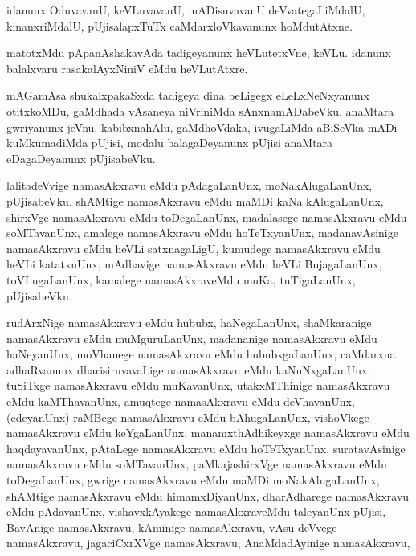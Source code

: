 \documentclass{article}
\begin{document}
\begin{mn}
idanunx  OduvavanU,  keVLuvavanU,  mADisuvavanU  deVvategaLiMdalU,  kinanxriMdalU,  pUjisalapxTuTx  
caMdarxloVkavanunx  hoMdutAtxne.
\end{mn}

\begin{mn}
matotxMdu  pApanAshakavAda  tadigeyanunx  heVLutetxVne,  keVLu.  idanunx  balalxvaru  rasakalAyxNiniV  eMdu  heVLutAtxre. 
\end{mn}

\begin{mn}
mAGamAsa  shukalxpakaSxda  tadigeya  dina  beLigegx  eLeLxNeNxyanunx  otitxkoMDu,  gaMdhada  vAsaneya  
niVriniMda  sAnxnamADabeVku.  anaMtara  gwriyanunx  jeVnu,  kabibxnahAlu,  gaMdhoVdaka,  ivugaLiMda  
aBiSeVka  mADi  kuMkumadiMda  pUjisi,  modalu  balagaDeyanunx  pUjisi  anaMtara  eDagaDeyanunx  pUjisabeVku.
\end{mn}

\begin{mn}
lalitadeVvige  namasAkxravu  eMdu  pAdagaLanUnx,  moNakAlugaLanUnx,  pUjisabeVku.  shAMtige  namasAkxravu  
eMdu  maMDi  kaNa kAlugaLanUnx,  shirxVge  namasAkxravu  eMdu  toDegaLanUnx,  madalasege  namasAkxravu  
eMdu  soMTavanUnx,  amalege  namasAkxravu  eMdu  hoTeTxyanUnx,  madanavAsinige  namasAkxravu  eMdu  heVLi  
satxnagaLigU,  kumudege  namasAkxravu  eMdu  heVLi  katatxnUnx,  mAdhavige  namasAkxravu eMdu  heVLi  
BujagaLanUnx,  toVLugaLanUnx,  kamalege  namasAkxraveMdu  muKa,  tuTigaLanUnx,  pUjisabeVku.
\end{mn}

\begin{mn}
rudArxNige  namasAkxravu  eMdu  hububx,  haNegaLanUnx,  shaMkaranige  namasAkxravu  eMdu  muMguruLanUnx,  
madananige  namasAkxravu  eMdu  haNeyanUnx,  moVhanege  namasAkxravu    eMdu  hububxgaLanUnx,  
caMdarxna adhaRvanunx  dharisiruvavaLige  namasAkxravu  eMdu  kaNuNxgaLanUnx,  tuSiTxge  namasAkxravu  
eMdu  muKavanUnx,  utakxMThinige  namasAkxravu  eMdu  kaMThavanUnx,  amuqtege  namasAkxravu  eMdu  
deVhavanUnx, (edeyanUnx) raMBege  namasAkxravu  eMdu  bAhugaLanUnx,  vishoVkege  namasAkxravu  eMdu  
keYgaLanUnx,  manamxthAdhikeyxge  namasAkxravu  eMdu  haqdayavanUnx,  pAtaLege  namasAkxravu  eMdu  
hoTeTxyanUnx,  suratavAsinige  namasAkxravu  eMdu  soMTavanUnx,  paMkajashirxVge  namasAkxravu  eMdu  
toDegaLanUnx,  gwrige  namasAkxravu  eMdu  maMDi  moNakAlugaLanUnx,  shAMtige  namasAkxravu  eMdu  
himamxDiyanUnx,  dharAdharege  namasAkxravu  eMdu  pAdavanUnx,  vishavxkAyakege  namasAkxraveMdu  
taleyanUnx  pUjisi,  BavAnige  namasAkxravu,  kAminige  namasAkxravu,  vAsu  deVvege  namasAkxravu,  
jagaciCxrXVge  namasAkxravu,  AnaMdadAyinige  namasAkxravu,
\end{mn}
\end{document}
